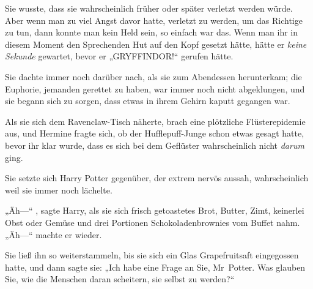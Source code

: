 Sie wusste, dass sie wahrscheinlich früher oder später verletzt werden würde. Aber wenn man zu viel Angst davor hatte, verletzt zu werden, um das Richtige zu tun, dann konnte man kein Held sein, so einfach war das. Wenn man ihr in diesem Moment den Sprechenden Hut auf den Kopf gesetzt hätte, hätte er \emph{keine Sekunde} gewartet, bevor er „GRYFFINDOR!“ gerufen hätte.

\later

Sie dachte immer noch darüber nach, als sie zum Abendessen herunterkam; die Euphorie, jemanden gerettet zu haben, war immer noch nicht abgeklungen, und sie begann sich zu sorgen, dass etwas in ihrem Gehirn kaputt gegangen war.

Als sie sich dem Ravenclaw-Tisch näherte, brach eine plötzliche Flüsterepidemie aus, und Hermine fragte sich, ob der Hufflepuff-Junge schon etwas gesagt hatte, bevor ihr klar wurde, dass es sich bei dem Geflüster wahrscheinlich nicht \emph{darum} ging.

Sie setzte sich Harry Potter gegenüber, der extrem nervös aussah, wahrscheinlich weil sie immer noch lächelte.

„Äh—“ , sagte Harry, als sie sich frisch getoastetes Brot, Butter, Zimt, keinerlei Obst oder Gemüse und drei Portionen Schokoladenbrownies vom Buffet nahm. „Äh—“ machte er wieder.

Sie ließ ihn so weiterstammeln, bis sie sich ein Glas Grapefruitsaft eingegossen hatte, und dann sagte sie: „Ich habe eine Frage an Sie, Mr~Potter. Was glauben Sie, wie die Menschen daran scheitern, sie selbst zu werden?“

